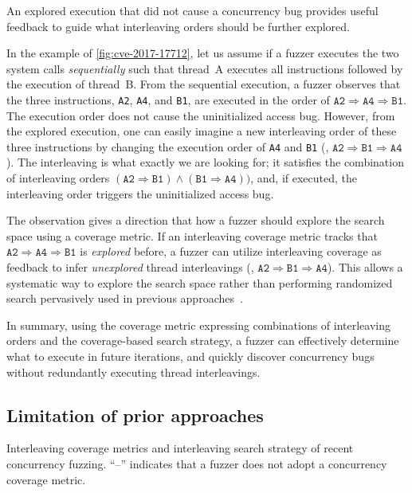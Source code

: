 %
An explored execution that did not cause a concurrency bug provides useful feedback 
to guide what interleaving orders should be further explored.

In the example of \autoref{fig:cve-2017-17712}, let us assume 
if a fuzzer executes the two system calls \textit{sequentially} 
such that thread~A executes all instructions followed by the execution of thread~B.
From the sequential execution, a fuzzer observes that the three instructions,
\texttt{A2}, \texttt{A4}, and \texttt{B1}, are  executed in the order of
$\texttt{A2} \Rightarrow \texttt{A4} \Rightarrow \texttt{B1}$. 
The execution order does not cause the uninitialized access bug.
%
However, from the explored execution, one can easily imagine a new interleaving order of these three
instructions by changing the execution order of \texttt{A4} and
\texttt{B1} (\ie,
$\texttt{A2} \Rightarrow \texttt{B1} \Rightarrow \texttt{A4}$).
%
The  interleaving is what exactly we are looking for; it
satisfies the combination of interleaving orders
$(\texttt{A2} \Rightarrow \texttt{B1}) \wedge (\texttt{B1} \Rightarrow
\texttt{A4}))$, and, if executed, the interleaving order triggers 
the uninitialized access bug.

The observation gives a direction that how a fuzzer should explore 
the search space using a coverage metric.
If an interleaving coverage metric tracks that
$\texttt{A2} \Rightarrow \texttt{A4} \Rightarrow \texttt{B1}$ is
\textit{explored} before, a fuzzer can utilize interleaving
coverage as feedback to infer \textit{unexplored} thread interleavings (\eg,
$\texttt{A2} \Rightarrow \texttt{B1} \Rightarrow \texttt{A4}$). 
This allows a systematic way to explore the search space rather than 
performing randomized search pervasively used in previous approaches~.

In summary, using the coverage metric expressing combinations of interleaving orders and the coverage-based search strategy, a fuzzer can effectively determine what to execute in future iterations, and quickly discover concurrency bugs
without redundantly executing thread interleavings.

\subsection{Limitation of prior approaches}
\label{ss:existingapproaches}
\begin{table}[t]
  \centering
  
  \caption{Interleaving coverage metrics and interleaving search
    strategy of recent concurrency fuzzing. ``--'' indicates that a
    fuzzer does not adopt a concurrency coverage metric. }
  \label{table:motivation}
\end{table}

